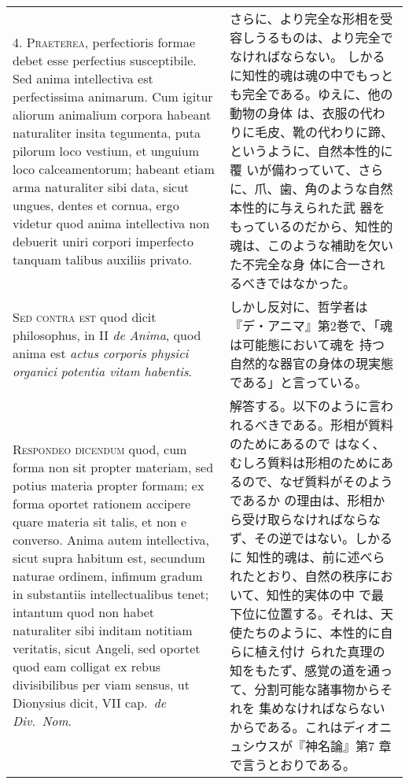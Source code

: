 \documentclass[paper=a4paper,fontsize=10pt,jafontsize=9pt,titlepage]{jlreq}
\begin{document}
\begin{longtable}{p{21em}p{21em}}
4. {\scshape Praeterea}, perfectioris formae debet esse perfectius
susceptibile. Sed anima intellectiva est perfectissima animarum. Cum
igitur aliorum animalium corpora habeant naturaliter insita tegumenta,
puta pilorum loco vestium, et unguium loco calceamentorum; habeant
etiam arma naturaliter sibi data, sicut ungues, dentes et cornua, ergo
videtur quod anima intellectiva non debuerit uniri corpori imperfecto
tanquam talibus auxiliis privato.
 
&

 さらに、より完全な形相を受容しうるものは、より完全でなければならない。
 しかるに知性的魂は魂の中でもっとも完全である。ゆえに、他の動物の身体
 は、衣服の代わりに毛皮、靴の代わりに蹄、というように、自然本性的に覆
 いが備わっていて、さらに、爪、歯、角のような自然本性的に与えられた武
 器をもっているのだから、知性的魂は、このような補助を欠いた不完全な身
 体に合一されるべきではなかった。
\\




 {\scshape Sed contra est} quod dicit philosophus, in II {\itshape de
 Anima}, quod anima est {\itshape actus corporis physici organici
 potentia vitam habentis}.
 
&

 しかし反対に、哲学者は『デ・アニマ』第2巻で、「魂は可能態において魂を
 持つ自然的な器官の身体の現実態である」と言っている。
 
\\




 {\scshape Respondeo dicendum} quod, cum forma non sit propter
 materiam, sed potius materia propter formam; ex forma oportet
 rationem accipere quare materia sit talis, et non e converso. Anima
 autem intellectiva, sicut supra habitum est, secundum naturae
 ordinem, infimum gradum in substantiis intellectualibus tenet;
 intantum quod non habet naturaliter sibi inditam notitiam veritatis,
 sicut Angeli, sed oportet quod eam colligat ex rebus divisibilibus
 per viam sensus, ut Dionysius dicit, VII cap.~{\itshape de Div.~Nom}.


&

 解答する。以下のように言われるべきである。形相が質料のためにあるので
 はなく、むしろ質料は形相のためにあるので、なぜ質料がそのようであるか
 の理由は、形相から受け取らなければならなず、その逆ではない。しかるに
 知性的魂は、前に述べられたとおり、自然の秩序において、知性的実体の中
 で最下位に位置する。それは、天使たちのように、本性的に自らに植え付け
 られた真理の知をもたず、感覚の道を通って、分割可能な諸事物からそれを
 集めなければならないからである。これはディオニュシウスが『神名論』第7
 章で言うとおりである。
 

\end{longtable}
\end{document}
